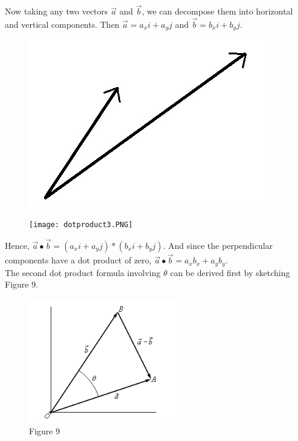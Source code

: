 \documentclass{article}
\begin{document}
            \noindent Now taking any two vectors $\overrightarrow{a}$ and $\overrightarrow{b}$, we
            can decompose them into horizontal and vertical components. Then
            $\overrightarrow{a}=a_xi+a_yj$ and $\overrightarrow{b}=b_xi+b_yj$.

            \begin{figure}[h]
                \centering
                \begin{minipage}{.5\textwidth}
                    \centering
                    \includegraphics[scale=0.3]{Resources/Unit3Vectors/dotproduct2.PNG}
                \end{minipage}%
                \begin{minipage}{.5\textwidth}
                    \centering
                    \texttt{[image: dotproduct3.PNG]}
                \end{minipage}
            \end{figure}

            \noindent Hence, $\overrightarrow{a}\bullet\overrightarrow{b}=(a_xi+a_yj)*(b_xi+b_yj)$.
            And since the perpendicular components have a dot product of zero,
            $\overrightarrow{a}\bullet\overrightarrow{b}=a_xb_x+a_yb_y$.\\

            \noindent The second dot product formula involving $\theta$ can be derived first by
            sketching Figure 9.

            \begin{figure} [h]
                \centering
                \includegraphics[scale=0.75]{Resources/Unit3Vectors/Fig9.PNG}
                \caption*{Figure 9}
            \end{figure}
\end{document}
